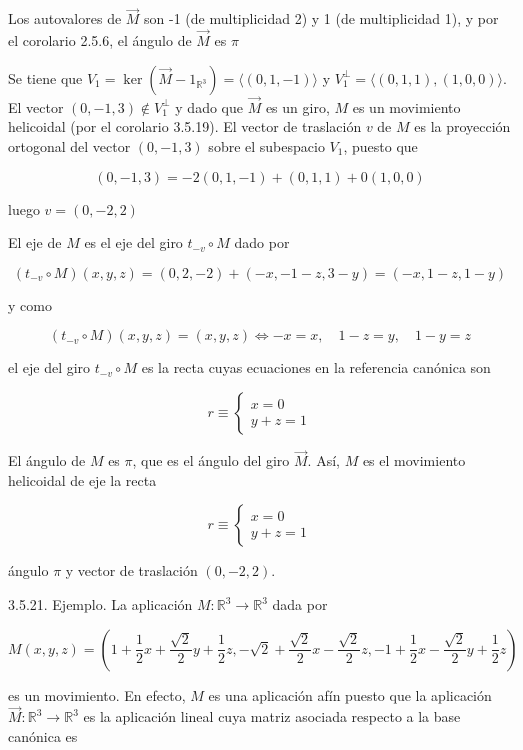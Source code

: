 \documentclass[12pt, a4paper, ones, notitlepage, openany,titlepage]{article}
\begin{document}
Los autovalores de $\overrightarrow{M}$ son -1 (de multiplicidad 2) y 1 (de multiplicidad 1), y por el corolario 2.5.6, el ángulo de $\overrightarrow{M}$ es $\pi$

Se tiene que $V_{1}=\ker\left(\overrightarrow{M}-1_{\mathbb{R}^{3}}\right)=\langle(0,1,-1)\rangle$ y $V_{1}^{\perp}=\langle(0,1,1),(1,0,0)\rangle$. El vector $(0,-1,3) \notin V_{1}^{\perp}$ y dado que $\overrightarrow{M}$ es un giro, $M$ es un movimiento helicoidal (por el corolario 3.5.19). El vector de traslación $v$ de $M$ es la proyección ortogonal del vector $(0,-1,3)$ sobre el subespacio $V_{1}$, puesto que

$$
(0,-1,3)=-2(0,1,-1)+(0,1,1)+0(1,0,0)
$$

luego $v=(0,-2,2)$

El eje de $M$ es el eje del giro $t_{-v} \circ M$ dado por

$$
\left(t_{-v} \circ M\right)(x, y, z)=(0,2,-2)+(-x,-1-z, 3-y)=(-x, 1-z, 1-y)
$$

y como

$$
\left(t_{-v} \circ M\right)(x, y, z)=(x, y, z) \Longleftrightarrow-x=x, \quad 1-z=y, \quad 1-y=z
$$

el eje del giro $t_{-v} \circ M$ es la recta cuyas ecuaciones en la referencia canónica son

$$
r \equiv\left\{\begin{array}{l}
	x=0 \\
	y+z=1
\end{array}\right.
$$

El ángulo de $M$ es $\pi$, que es el ángulo del giro $\overrightarrow{M}$. Así, $M$ es el movimiento helicoidal de eje la recta

$$
r \equiv\left\{\begin{array}{l}
	x=0 \\
	y+z=1
\end{array}\right.
$$

ángulo $\pi$ y vector de traslación $(0,-2,2)$.

3.5.21. Ejemplo. La aplicación $M: \mathbb{R}^{3} \rightarrow \mathbb{R}^{3}$ dada por

$$
M(x, y, z)=\left(1+\frac{1}{2} x+\frac{\sqrt{2}}{2} y+\frac{1}{2} z,-\sqrt{2}+\frac{\sqrt{2}}{2} x-\frac{\sqrt{2}}{2} z,-1+\frac{1}{2} x-\frac{\sqrt{2}}{2} y+\frac{1}{2} z\right)
$$

es un movimiento. En efecto, $M$ es una aplicación afín puesto que la aplicación $\overrightarrow{M}: \mathbb{R}^{3} \rightarrow \mathbb{R}^{3}$ es la aplicación lineal cuya matriz asociada respecto a la base canónica es
\end{document}

